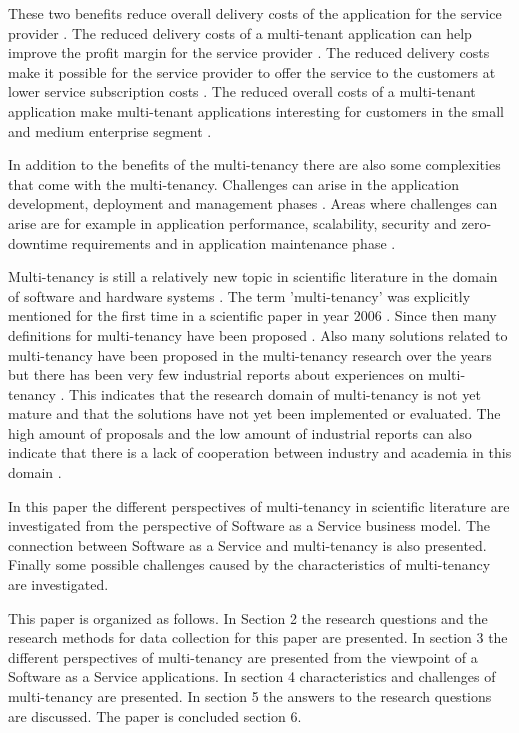 \documentclass[conference]{sasmoota2017}
\begin{document}
These two benefits reduce overall delivery costs of the application for the service provider \cite{Bezemer:2010:MaintenanceDream}. The reduced delivery costs of a multi-tenant application can help improve the profit margin for the service provider \cite{Guo:2007:FrameworkForNative}. The reduced delivery costs make it possible for the service provider to offer the service to the customers at lower service subscription costs \cite{Guo:2007:FrameworkForNative}. The reduced overall costs of a multi-tenant application make multi-tenant applications interesting for customers in the small and medium enterprise segment \cite{Bezemer:2010:MaintenanceDream}.

In addition to the benefits of the multi-tenancy there are also some complexities that come with the multi-tenancy. Challenges can arise in the application development, deployment and management phases \cite{Guo:2007:FrameworkForNative}. Areas where challenges can arise are for example in application performance, scalability, security and zero-downtime requirements and in application maintenance phase \cite{Bezemer:2010:MaintenanceDream}. 

Multi-tenancy is still a relatively new topic in scientific literature in the domain of software and hardware systems \cite{Kabbedijk2015:Defining}. The term 'multi-tenancy' was explicitly mentioned for the first time in a scientific paper in year 2006 \cite{Kabbedijk2015:Defining, Carraro:2006:ArchitectureLongTail}. Since then many definitions for multi-tenancy have been proposed \cite{Kabbedijk2015:Defining}. Also many solutions related to multi-tenancy have been proposed in the multi-tenancy research over the years but there has been very few industrial reports about experiences on multi-tenancy \cite{Kabbedijk2015:Defining}. This indicates that the research domain of multi-tenancy is not yet mature and that the solutions have not yet been implemented or evaluated. The high amount of proposals and the low amount of industrial reports can also indicate that there is a lack of cooperation between industry and academia in this domain \cite{Kabbedijk2015:Defining}.

In this paper the different perspectives of multi-tenancy in scientific literature are investigated from the perspective of Software as a Service business model. The connection between Software as a Service and multi-tenancy is also presented. Finally some possible challenges caused by the characteristics of multi-tenancy are investigated.

This paper is organized as follows. In Section 2 the research questions and the research methods for data collection for this paper are presented. In section 3 the different perspectives of multi-tenancy are presented from the viewpoint of a Software as a Service applications. In section 4 characteristics and challenges of multi-tenancy are presented. In section 5 the answers to the research questions are discussed. The paper is concluded section 6. 
\end{document}
